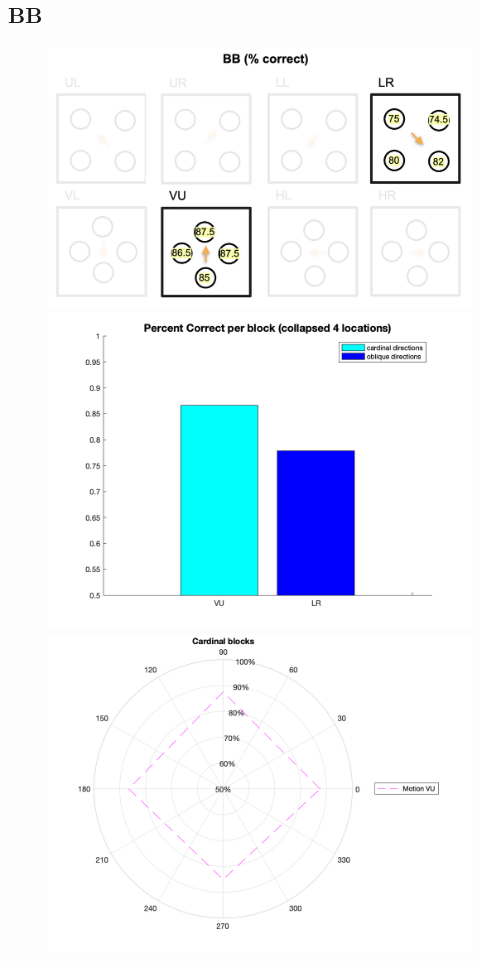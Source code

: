 \documentclass[11pt]{article} %
\begin{document}
\subsection{BB}
\begin{figure}[H]
\centering %
\includegraphics[scale=.25]{Images/BB_trialdescription.png}
\includegraphics[scale=.15]{Images/block_performance_BB.png}
\\
\includegraphics[scale=.15]{Images/BB_cardinal_plot.png}

\end{figure}
\end{document}

